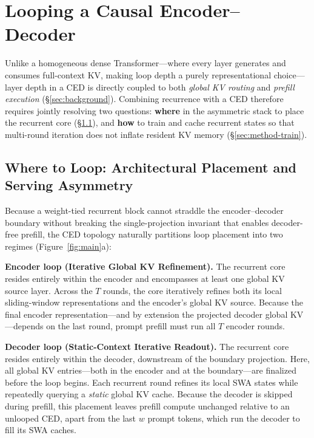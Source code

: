 \section{Looping a Causal Encoder--Decoder}
\label{sec:method}

Unlike a homogeneous dense Transformer—where every layer generates and consumes full-context KV, making loop depth a purely representational choice—layer depth in a CED is directly coupled to both \emph{global KV routing} and \emph{prefill execution} (\S\ref{sec:background}). Combining recurrence with a CED therefore requires jointly resolving two questions: \textbf{where} in the asymmetric stack to place the recurrent core (\S\ref{sec:method-where}), and \textbf{how} to train and cache recurrent states so that multi-round iteration does not inflate resident KV memory (\S\ref{sec:method-train}).

\subsection{Where to Loop: Architectural Placement and Serving Asymmetry}
\label{sec:method-where}

Because a weight-tied recurrent block cannot straddle the encoder--decoder boundary without breaking the single-projection invariant that enables decoder-free prefill, the CED topology naturally partitions loop placement into two regimes (Figure~\ref{fig:main}a):

\textbf{Encoder loop (Iterative Global KV Refinement).} The recurrent core resides entirely within the encoder and encompasses at least one global KV source layer. Across the $T$ rounds, the core iteratively refines both its local sliding-window representations and the encoder's global KV source. Because the final encoder representation—and by extension the projected decoder global KV—depends on the last round, prompt prefill must run all $T$ encoder rounds.

\textbf{Decoder loop (Static-Context Iterative Readout).} The recurrent core resides entirely within the decoder, downstream of the boundary projection. Here, all global KV entries—both in the encoder and at the boundary—are finalized before the loop begins. Each recurrent round refines its local SWA states while repeatedly querying a \emph{static} global KV cache. Because the decoder is skipped during prefill, this placement leaves prefill compute unchanged relative to an unlooped CED, apart from the last $w$ prompt tokens, which run the decoder to fill its SWA caches.

